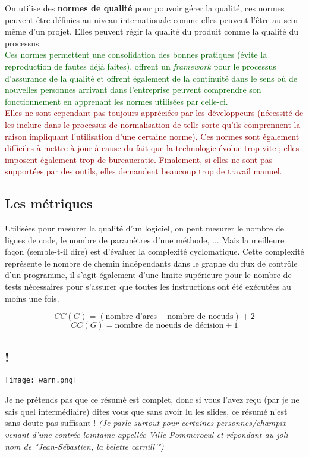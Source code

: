 \documentclass{article}
\newcommand{\gre}[1]{\textcolor{darkgreen}{#1}}
\newcommand{\ora}[1]{\textcolor{darko}{#1}}
\newcommand{\rouge}[1]{\textcolor{darkred}{#1}}
\begin{document}
\begin{sffamily}
On utilise des \textbf{normes de qualité} pour pouvoir gérer la qualité, ces normes peuvent être définies au niveau 
internationale comme elles peuvent l'être au sein même d'un projet. Elles peuvent régir la qualité du produit comme la qualité
du processus.\\
\gre{Ces normes permettent une consolidation des bonnes pratiques (évite la reproduction de fautes déjà faites), 
offrent un \textit{framework} pour le processus d'assurance de la qualité et offrent également de la continuité dans le sens où 
de nouvelles personnes arrivant dans l'entreprise peuvent comprendre son fonctionnement en apprenant les normes utilisées par
celle-ci.}\\
\rouge{Elles ne sont cependant pas toujours appréciées par les développeurs (nécessité de les inclure dans le processus de 
normalisation de telle sorte qu'ils comprennent la raison impliquant l'utilisation d'une certaine norme). Ces normes sont
également difficiles à mettre à jour à cause du fait que la technologie évolue trop vite ; elles imposent également trop de
bureaucratie. Finalement, si elles ne sont pas supportées par des outils, elles demandent beaucoup trop de travail manuel.}

\subsection{Les métriques}

Utilisées pour mesurer la qualité d'un logiciel, on peut mesurer le nombre de lignes de code, le nombre de paramètres d'une 
méthode, ... Mais la meilleure façon (semble-t-il dire) est d'évaluer la \ora{complexité cyclomatique}. Cette complexité 
représente le nombre de chemin indépendants dans le graphe du flux de contrôle d'un programme, il s'agit également d'une limite
supérieure pour le nombre de tests nécessaires pour s'assurer que toutes les instructions ont été exécutées au moins une fois.

$$ \boxed{CC(G) = (\text{nombre d'arcs} - \text{nombre de noeuds}) + 2}$$
$$ \boxed{CC(G) = \text{nombre de noeuds de décision} + 1}$$

\subsection{!}

\begin{center}
\texttt{[image: warn.png]}
\end{center}

Je ne prétends pas que ce résumé est complet, donc si vous l'avez reçu (par je ne sais quel intermédiaire) dites vous que sans 
avoir lu les slides, ce résumé n'est sans doute pas suffisant ! \textit{(Je parle surtout pour certaines personnes/champix 
venant d'une contrée lointaine appellée Ville-Pommeroeul et répondant au joli nom de "Jean-Sébastien, la belette carnill'")}
\end{sffamily}
\end{document}
